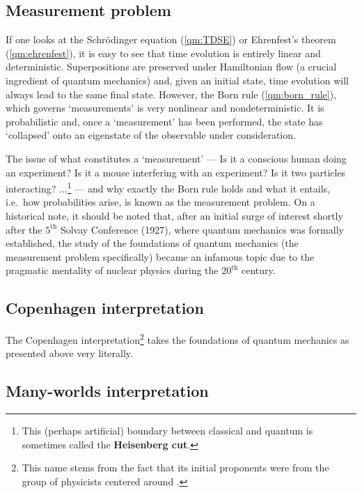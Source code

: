 \subsection{Measurement problem}

    If one looks at the Schr\"odinger equation (\cref{qm:TDSE}) or Ehrenfest's theorem (\cref{qm:ehrenfest}), it is easy to see that time evolution is entirely linear and deterministic. Superpositions are preserved under Hamiltonian flow (a crucial ingredient of quantum mechanics) and, given an initial state, time evolution will always lead to the same final state. However, the Born rule (\cref{qm:born_rule}), which governs `measurements' is very nonlinear and nondeterministic. It is probabilistic and, once a `measurement' has been performed, the state has `collapsed' onto an eigenstate of the observable under consideration.

    The issue of what constitutes a `measurement' --- Is it a conscious human doing an experiment? Is it a mouse interfering with an experiment? Is it two particles interacting? ...\footnote{This (perhaps artificial) boundary between classical and quantum is sometimes called the \textbf{Heisenberg cut}.} --- and why exactly the Born rule holds and what it entails, i.e.~how probabilities arise, is known as the measurement problem. On a historical note, it should be noted that, after an initial surge of interest shortly after the $5^{\text{th}}$ Solvay Conference (1927), where quantum mechanics was formally established, the study of the foundations of quantum mechanics (the measurement problem specifically) became an infamous topic due to the pragmatic mentality of nuclear physics during the $20^{\text{th}}$ century.


\subsection{Copenhagen interpretation}

    The Copenhagen interpretation\footnote{This name stems from the fact that its initial proponents were from the group of physicists centered around .} takes the foundations of quantum mechanics as presented above very literally. 


\subsection{Many-worlds interpretation}

